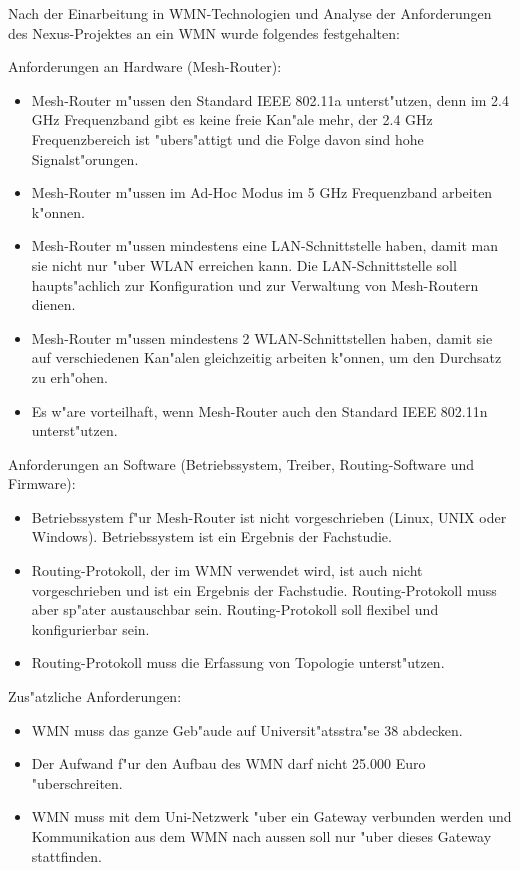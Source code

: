 Nach der Einarbeitung in WMN-Technologien und Analyse der Anforderungen
des Nexus-Projektes an ein WMN wurde folgendes festgehalten:

Anforderungen an Hardware (Mesh-Router):

\begin{itemize}
\item Mesh-Router m"ussen den Standard IEEE 802.11a unterst"utzen, denn
im 2.4 GHz Frequenzband gibt es keine freie Kan"ale mehr, der 2.4 GHz
Frequenzbereich ist "ubers"attigt und die Folge davon sind hohe
Signalst"orungen.
\item Mesh-Router m"ussen im Ad-Hoc Modus im 5 GHz Frequenzband arbeiten
k"onnen.
\item Mesh-Router m"ussen mindestens eine LAN-Schnittstelle haben, damit man
sie nicht nur "uber WLAN erreichen kann. Die LAN-Schnittstelle soll
haupts"achlich zur Konfiguration und zur Verwaltung von Mesh-Routern dienen.
\item Mesh-Router m"ussen mindestens 2 WLAN-Schnittstellen haben, damit sie
auf verschiedenen Kan"alen gleichzeitig arbeiten k"onnen, um den Durchsatz
zu erh"ohen.
\item Es w"are vorteilhaft, wenn Mesh-Router auch den Standard IEEE 802.11n
unterst"utzen.
\end{itemize}

Anforderungen an Software (Betriebssystem, Treiber, Routing-Software und
		Firmware):

\begin{itemize}
\item Betriebssystem f"ur Mesh-Router ist nicht vorgeschrieben (Linux, UNIX oder
Windows). Betriebssystem ist ein Ergebnis der Fachstudie.
\item Routing-Protokoll, der im WMN verwendet wird, ist auch nicht
vorgeschrieben und ist ein Ergebnis der Fachstudie. Routing-Protokoll muss
aber sp"ater austauschbar sein. Routing-Protokoll soll flexibel und
konfigurierbar sein.
\item Routing-Protokoll muss die Erfassung von Topologie unterst"utzen.
\end{itemize}

Zus"atzliche Anforderungen:

\begin{itemize}
\item WMN muss das ganze Geb"aude auf Universit"atsstra"se 38 abdecken.
\item Der Aufwand f"ur den Aufbau des WMN darf nicht 25.000 Euro "uberschreiten.
\item WMN muss mit dem Uni-Netzwerk "uber ein Gateway verbunden werden und
Kommunikation aus dem WMN nach aussen soll nur "uber dieses Gateway
stattfinden.
\end{itemize}